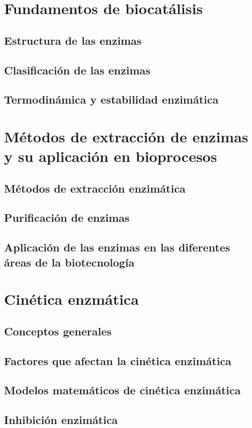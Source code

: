 \documentclass{../Resume}
\begin{document}
\Portada
\Indice
\fancystyle
\onehalfspacing


\part{Fundamentos de biocatálisis}

    \chapter{Estructura de las enzimas}
    \chapter{Clasificación de las enzimas}
    \chapter{Termodinámica y estabilidad enzimática}
    
\part{Métodos de extracción de enzimas y su aplicación en bioprocesos}

    \chapter{Métodos de extracción enzimática}
        
    
    \chapter{Purificación de enzimas}
        
        
    \chapter{Aplicación de las enzimas en las diferentes áreas de la biotecnología}

\part{Cinética enzmática}

    \chapter{Conceptos generales}
        
        
    \chapter{Factores que afectan la cinética enzimática}
    \chapter{Modelos matemáticos de cinética enzimática}
        
    
    \chapter{Inhibición enzimática}


\newpage 
\end{document}

